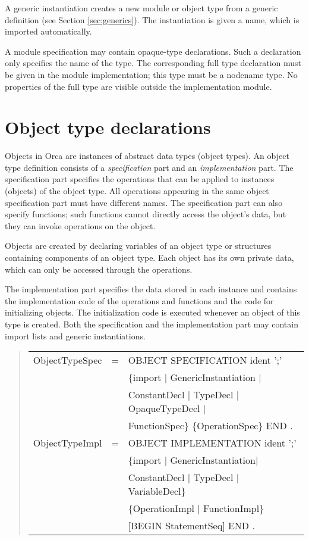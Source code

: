\documentclass[10pt]{article}
\newenvironment{grammar}
{\begin{quote} \begin{tabular}{p{3.8cm} l l}}
{\end{tabular}\end{quote}}
\begin{document}
A generic instantiation creates a new module or object type from a
generic definition (see Section \ref{sec:generics}). The instantiation is given a name,
which is imported automatically.

A module specification may contain opaque-type declarations.
Such a declaration only specifies the name of the type.
The corresponding full type declaration must be given in the
module implementation;
this type must be a nodename type.
No properties of the full type are visible outside the implementation module.
\section{Object type declarations}\label{sec:objects}

Objects in Orca are instances of abstract data types (object types).
An object type definition consists of a {\em specification} part and
an {\em implementation} part.
The specification part specifies the operations that can be applied to instances
(objects) of the object type.
All operations appearing in the same object specification part must have
different names.
The specification part can also specify functions; such functions cannot
directly access the object's data, but they can invoke operations
on the object.

Objects are created by declaring variables of an object type
or structures containing components of an object type.
Each object has its own private data, which can only be accessed through
the operations.

The implementation part specifies the data stored in each instance
and contains the implementation code of the operations and functions
and the code for initializing objects.
The initialization code is executed whenever an object of this type
is created.
Both the specification and the implementation part may contain import lists
and generic instantiations.
\begin{grammar}
ObjectTypeSpec & = & OBJECT SPECIFICATION ident ';' \\
& & \{import $|$ GenericInstantiation $|$ \\
& & ConstantDecl $|$ TypeDecl $|$ OpaqueTypeDecl $|$ \\
& & FunctionSpec\} \{OperationSpec\} END . \\
ObjectTypeImpl & = & OBJECT IMPLEMENTATION ident ';' \\
& & \{import $|$ GenericInstantiation$|$ \\
& & ConstantDecl $|$ TypeDecl $|$ VariableDecl\} \\
& & \{OperationImpl $|$ FunctionImpl\} \\
& & [BEGIN StatementSeq] END .
\end{grammar}
\end{document}
